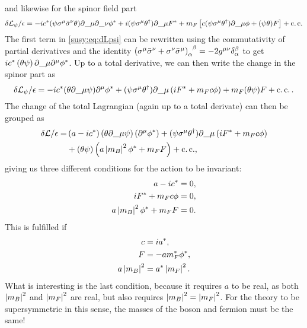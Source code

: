 \documentclass[../main.tex]{subfiles}
\begin{document}
and likewise for the spinor field part
\begin{equation}
  \label{susy:eq:dLpsi}
  \delta\L_\psi/\epsilon = -i c^\ast (\psi \sigma\^{\mu}\bar{\sigma}\^{\nu}\theta) \partial\_{\mu}\partial\_{\nu} \phi^\ast + i (\psi \sigma\^{\mu} \theta^\dagger) \partial\_{\mu} F^\ast + m_F \bclosed{c (\psi\sigma\^{\mu}\theta^\dagger) \partial\_{\mu} \phi + (\psi\theta) F} + \cc
\end{equation}
The first term in \cref{susy:eq:dLpsi} can be rewritten using the commutativity of partial derivatives and the identity \(\tensor{\pclosed{\sigma\^{\mu} \bar{\sigma}\^{\nu} + \sigma\^{\nu} \bar{\sigma}\^{\mu}}}{_\alpha^\beta} = -2\tensor{g}{^\mu^\nu} \tensor*{\delta}{_\alpha^\beta}\) to get \(i c^\ast \pclosed{\theta \psi} \partial\_{\mu}\partial\^{\mu} \phi^\ast\).
Up to a total derivative, we can then write the change in the spinor part as
\begin{equation}
  \delta\L_\psi/\epsilon = -i c^\ast (\theta\partial\_{\mu}\psi)\partial\^{\mu} \phi^\ast + (\psi \sigma\^{\mu} \theta^\dagger) \partial\_{\mu} \pclosed{i F^\ast + m_F c \phi} + m_F (\theta\psi) F + \cc.
\end{equation}
The change of the total Lagrangian (again up to a total derivate) can then be grouped as
\begin{align}
  \nonumber
  \delta\L/\epsilon = & \pclosed{a-ic^\ast} (\theta\partial\_{\mu}\psi) \pclosed{\partial\^{\mu} \phi^\ast}
  + (\psi \sigma\^{\mu} \theta^\dagger) \partial\_{\mu} \pclosed{i F^\ast + m_F c \phi}                     \\
                      & + (\theta\psi) \pclosed{a\abs{m_B}^2\phi^\ast + m_F F} + \cc,
\end{align}
giving us three different conditions for the action to be invariant:
\begin{subequations}
  \begin{align}
    a - ic^\ast                    & = 0, \\
    i F^\ast + m_F c \phi          & = 0, \\
    a\left|m_B\right|^2 \phi^\ast + m_F F & = 0.
  \end{align}
\end{subequations}
This is fulfilled if
\begin{subequations}
  \begin{align}
    c            & = i a^\ast,              \\
    F            & = -a m_F^\ast \phi^\ast, \\
    a\left|m_B\right|^2 & = a^\ast \left|m_F\right|^2.
  \end{align}
\end{subequations}
What is interesting is the last condition, because it requires \(a\) to be real, as both \(\left|m_B\right|^2\) and \(\left|m_F\right|^2\) are real, but also requires \(\left|m_B\right|^2 = \left|m_F\right|^2\).
For the theory to be supersymmetric in this sense, the masses of the boson and fermion must be the same!
\end{document}
